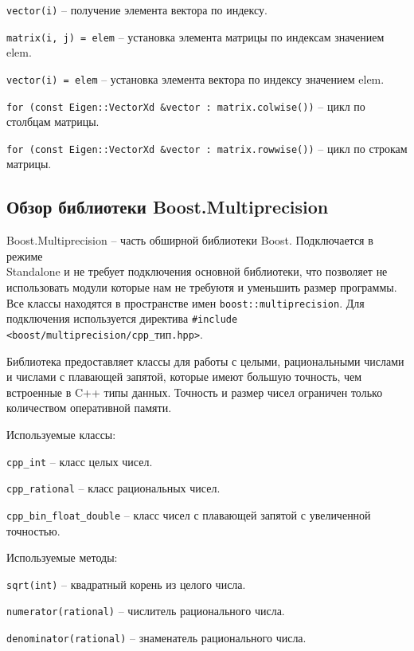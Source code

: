 \verb!vector(i)! -- получение элемента вектора по индексу.

\verb!matrix(i, j) = elem! -- установка элемента матрицы по индексам значением elem.

\verb!vector(i) = elem! -- установка элемента вектора по индексу значением elem.

\verb!for (const Eigen::VectorXd &vector : matrix.colwise())! -- цикл по столбцам матрицы.

\verb!for (const Eigen::VectorXd &vector : matrix.rowwise())! -- цикл по строкам матрицы.

\subsection{Обзор библиотеки Boost.Multiprecision}

Boost.Multiprecision -- часть обширной библиотеки Boost. Подключается в режиме \\ Standalone и не требует подключения основной библиотеки, что позволяет не использовать модули которые нам не требуютя и уменьшить размер программы. Все классы находятся в пространстве имен \verb!boost::multiprecision!. Для подключения используется директива  \verb!#include! \\ \verb!<boost/multiprecision/cpp_!тип\verb!.hpp>!.

Библиотека предоставляет классы для работы с целыми, рациональными числами и числами с плавающей запятой, которые имеют большую точность, чем встроенные в C++ типы данных. Точность и размер чисел ограничен только количеством оперативной памяти. 

Используемые классы:

\verb!cpp_int! -- класс целых чисел.

\verb!cpp_rational! -- класс рациональных чисел.

\verb!cpp_bin_float_double! -- класс чисел с плавающей запятой с увеличенной точностью.

Используемые методы:

\verb!sqrt(int)! -- квадратный корень из целого числа.

\verb!numerator(rational)! -- числитель рационального числа.

\verb!denominator(rational)! -- знаменатель рационального числа.

\clearpage